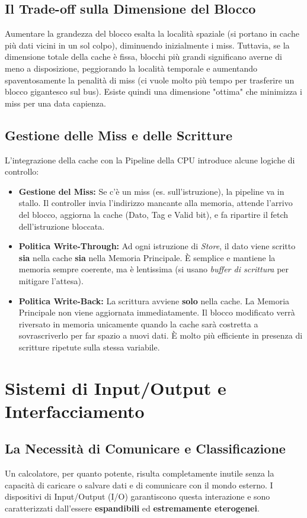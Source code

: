 \documentclass[12pt, a4paper]{article}
\begin{document}
\subsection{Il Trade-off sulla Dimensione del Blocco}
Aumentare la grandezza del blocco esalta la località spaziale (si portano in cache più dati vicini in un sol colpo), diminuendo inizialmente i miss. Tuttavia, se la dimensione totale della cache è fissa, blocchi più grandi significano averne di meno a disposizione, peggiorando la località temporale e aumentando spaventosamente la penalità di miss (ci vuole molto più tempo per trasferire un blocco gigantesco sul bus). Esiste quindi una dimensione "ottima" che minimizza i miss per una data capienza.

\newpage

\subsection{Gestione delle Miss e delle Scritture}
L'integrazione della cache con la Pipeline della CPU introduce alcune logiche di controllo:
\begin{itemize}
    \item \textbf{Gestione del Miss:} Se c'è un miss (es. sull'istruzione), la pipeline va in stallo. Il controller invia l'indirizzo mancante alla memoria, attende l'arrivo del blocco, aggiorna la cache (Dato, Tag e Valid bit), e fa ripartire il fetch dell'istruzione bloccata.
    \item \textbf{Politica Write-Through:} Ad ogni istruzione di \textit{Store}, il dato viene scritto \textbf{sia} nella cache \textbf{sia} nella Memoria Principale. È semplice e mantiene la memoria sempre coerente, ma è lentissima (si usano \textit{buffer di scrittura} per mitigare l'attesa).
    \item \textbf{Politica Write-Back:} La scrittura avviene \textbf{solo} nella cache. La Memoria Principale non viene aggiornata immediatamente. Il blocco modificato verrà riversato in memoria unicamente quando la cache sarà costretta a sovrascriverlo per far spazio a nuovi dati. È molto più efficiente in presenza di scritture ripetute sulla stessa variabile.
\end{itemize}


\section{Sistemi di Input/Output e Interfacciamento}

\subsection{La Necessità di Comunicare e Classificazione}
Un calcolatore, per quanto potente, risulta completamente inutile senza la capacità di caricare o salvare dati e di comunicare con il mondo esterno. 
I dispositivi di Input/Output (I/O) garantiscono questa interazione e sono caratterizzati dall'essere \textbf{espandibili} ed \textbf{estremamente eterogenei}. 
\end{document}
